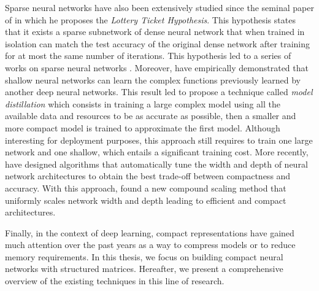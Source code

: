 Sparse neural networks have also been extensively studied since the seminal paper of \citet{frankle2018lottery} in which he proposes the \emph{Lottery Ticket Hypothesis}. 
This hypothesis states that it exists a sparse subnetwork of dense neural network that when trained in isolation can match the test accuracy of the original dense network after training for at most the same number of iterations. 
This hypothesis led to a series of works on sparse neural networks \cite{zhou2019deconstructing,malach2019proving,evci2020rigging}.
Moreover, \citet{ba2014deep} have empirically demonstrated that shallow neural networks can learn the complex functions previously learned by another deep neural networks.
This result led \citet{hinton2015distilling} to propose a technique called \emph{model distillation} which consists in training a large complex model using all the available data and resources to be as accurate as possible, then a smaller and more compact model is trained to approximate the first model.
Although interesting for deployment purposes, this approach still requires to train one large network and one shallow, which entails a significant training cost.
More recently, \citet{zoph2018learning,real2019regularized} have designed algorithms that automatically tune the width and depth of neural network architectures to obtain the best trade-off between compactness and accuracy.
With this approach, \citet{tan2019efficientnet} found a new compound scaling method that uniformly scales network width and depth leading to efficient and compact architectures.

Finally, in the context of deep learning, compact representations have gained much attention over the past years as a way to compress models or to reduce memory requirements.
In this thesis, we focus on building compact neural networks with structured matrices.
Hereafter, we present a comprehensive overview of the existing techniques in this line of research.















%

